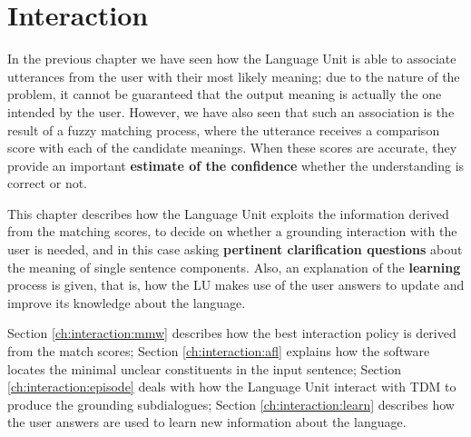 
\chapter{Interaction} %

\label{ch:interaction} %


In the previous chapter we have seen how the Language Unit is able to associate utterances from the user with their most likely meaning; due to the nature of the problem, it cannot be guaranteed that the output meaning is actually the one intended by the user. However, we have also seen that such an association is the result of a fuzzy matching process, where the utterance receives a comparison score with each of the candidate meanings. When these scores are accurate, they provide an important \textbf{estimate of the confidence} whether the understanding is correct or not.

This chapter describes how the Language Unit exploits the information derived from the matching scores, to decide on whether a grounding interaction with the user is needed, and in this case asking \textbf{pertinent clarification questions} about the meaning of single sentence components. Also, an explanation of the \textbf{learning} process is given, that is, how the LU makes use of the user answers to update and improve its knowledge about the language.

Section \ref{ch:interaction:mmw} describes how the best interaction policy is derived from the match scores; Section \ref{ch:interaction:afl} explains how the software locates the minimal unclear constituents in the input sentence; Section \ref{ch:interaction:episode} deals with how the Language Unit interact with TDM to produce the grounding subdialogues; Section \ref{ch:interaction:learn} describes how the user answers are used to learn new information about the language.


